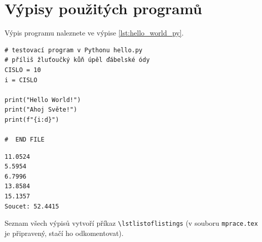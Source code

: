 
\section{Výpisy použitých programů}

\lipsum[1]

Výpis programu  naleznete ve výpise \ref{lst:hello_world_py}.

\begin{lstlisting}[title={Program hello.py}, caption={hello.py}, label={lst:hello_world_py}]
# testovací program v Pythonu hello.py
# příliš žluťoučký kůň úpěl ďábelské ódy
CISLO = 10
i = CISLO

print("Hello World!")
print("Ahoj Světe!")
print(f"{i:d}")

#  END FILE
\end{lstlisting}

\lipsum[1]

\begin{lstlisting}[numbers=none, title={Příklad výstupního souboru}]
11.0524
5.5954
6.7996
13.8584
15.1357
Soucet: 52.4415
\end{lstlisting}

Seznam všech výpisů vytvoří příkaz \verb|\lstlistoflistings|
(v souboru \texttt{mprace.tex} je připravený, stačí ho odkomentovat).
